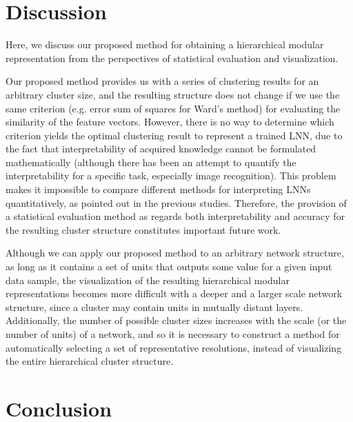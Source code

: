\documentclass{article}
\begin{document}

\section{Discussion}

Here, we discuss our proposed method for obtaining a hierarchical modular representation from the perspectives of statistical evaluation and visualization. 

Our proposed method provides us with a series of clustering results for an arbitrary cluster size, and the resulting structure does not change if we use the same criterion (e.g. error sum of squares for Ward's method) for evaluating the similarity of the feature vectors. However, there is no way to determine which criterion yields the optimal clustering result to represent a trained LNN, due to the fact that interpretability of acquired knowledge cannot be formulated mathematically (although there has been an attempt to quantify the interpretability for a specific task, especially image recognition\cite{Bau2017}). 
This problem makes it impossible to compare different methods for interpreting LNNs quantitatively, as pointed out in the previous studies\cite{Lipton2016,DoshiVelez2017}. 
Therefore, the provision of a statistical evaluation method as regards both interpretability and accuracy for the resulting cluster structure constitutes important future work. 

Although we can apply our proposed method to an arbitrary network structure, as long as it contains a set of units that outputs some value for a given input data sample, the visualization of the resulting hierarchical modular representations becomes more difficult with a deeper and a larger scale network structure, since a cluster may contain units in mutually distant layers. Additionally, the number of possible cluster sizes increases with the scale (or the number of units) of a network, and so it is necessary to construct a method for automatically selecting a set of representative resolutions, instead of visualizing the entire hierarchical cluster structure. 


\section{Conclusion}
\end{document}
